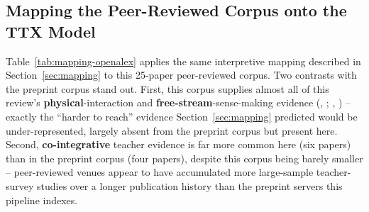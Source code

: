 \documentclass[11pt]{article}
\begin{document}
\subsection{Mapping the Peer-Reviewed Corpus onto the TTX Model}
\label{sec:mapping-openalex}

Table~\ref{tab:mapping-openalex} applies the same interpretive mapping described in Section~\ref{sec:mapping} to this 25-paper peer-reviewed corpus. Two contrasts with the preprint corpus stand out. First, this corpus supplies almost all of this review's \textbf{physical}-interaction and \textbf{free-stream}-sense-making evidence (\citeauthor{heissel2019physio}, \citeyear{heissel2019physio}; \citeauthor{brizuela2016autorreportes}, \citeyear{brizuela2016autorreportes}) -- exactly the ``harder to reach'' evidence Section~\ref{sec:mapping} predicted would be under-represented, largely absent from the preprint corpus but present here. Second, \textbf{co-integrative} teacher evidence is far more common here (six papers) than in the preprint corpus (four papers), despite this corpus being barely smaller -- peer-reviewed venues appear to have accumulated more large-sample teacher-survey studies over a longer publication history than the preprint servers this pipeline indexes.
\end{document}
